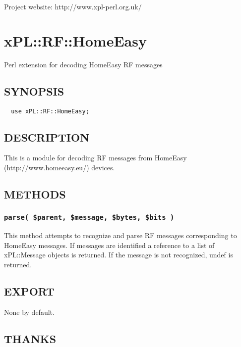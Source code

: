 Project website: http://www.xpl-perl.org.uk/

\section{xPL::RF::HomeEasy\label{xPL::RF::HomeEasy}}


Perl extension for decoding HomeEasy RF messages

\subsection*{SYNOPSIS\label{xPL::RF::HomeEasy_SYNOPSIS}}
\begin{verbatim}
  use xPL::RF::HomeEasy;
\end{verbatim}
\subsection*{DESCRIPTION\label{xPL::RF::HomeEasy_DESCRIPTION}}


This is a module for decoding RF messages from HomeEasy
(http://www.homeeasy.eu/) devices.

\subsection*{METHODS\label{xPL::RF::HomeEasy_METHODS}}
\subsubsection*{\texttt{parse( \$parent, \$message, \$bytes, \$bits )}\label{xPL::RF::HomeEasy_parse_parent_message_bytes_bits_}}


This method attempts to recognize and parse RF messages corresponding
to HomeEasy messages.  If messages are identified a reference to a
list of xPL::Message objects is returned.  If the message is not
recognized, undef is returned.

\subsection*{EXPORT\label{xPL::RF::HomeEasy_EXPORT}}


None by default.

\subsection*{THANKS\label{xPL::RF::HomeEasy_THANKS}}


